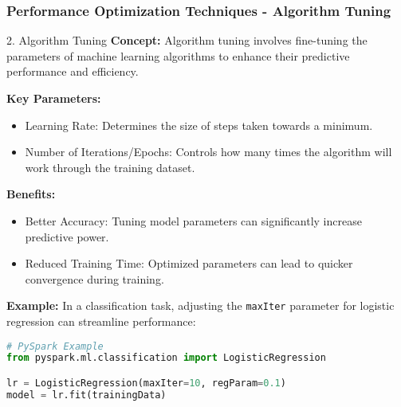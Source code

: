 \documentclass[aspectratio=169]{beamer}
\begin{document}
\begin{frame}[fragile]
    \frametitle{Performance Optimization Techniques - Algorithm Tuning}
    \begin{block}{2. Algorithm Tuning}
        \textbf{Concept:} Algorithm tuning involves fine-tuning the parameters of machine learning algorithms to enhance their predictive performance and efficiency.
        
        \textbf{Key Parameters:}
        \begin{itemize}
            \item Learning Rate: Determines the size of steps taken towards a minimum.
            \item Number of Iterations/Epochs: Controls how many times the algorithm will work through the training dataset.
        \end{itemize}
        
        \textbf{Benefits:}
        \begin{itemize}
            \item Better Accuracy: Tuning model parameters can significantly increase predictive power.
            \item Reduced Training Time: Optimized parameters can lead to quicker convergence during training.
        \end{itemize}
        
        \textbf{Example:} In a classification task, adjusting the \texttt{maxIter} parameter for logistic regression can streamline performance:
        \begin{lstlisting}[language=Python]
# PySpark Example
from pyspark.ml.classification import LogisticRegression

lr = LogisticRegression(maxIter=10, regParam=0.1)
model = lr.fit(trainingData)
        \end{lstlisting}
    \end{block}
\end{frame}
\end{document}
